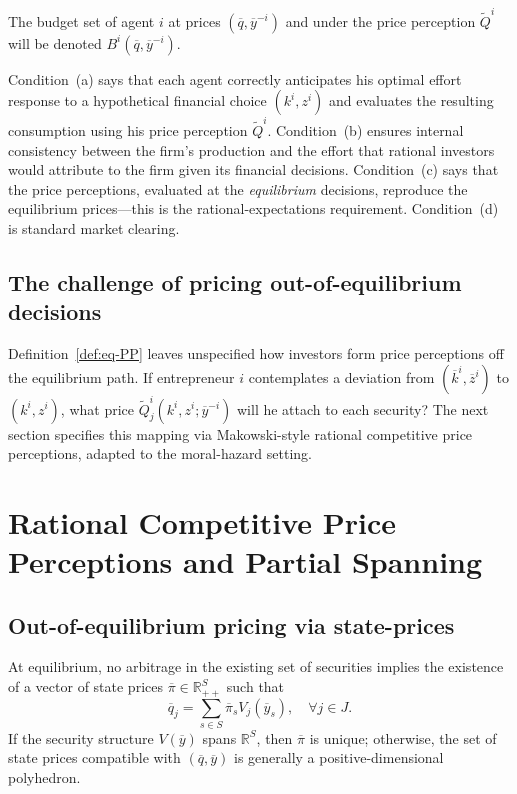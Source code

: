 \documentclass[11pt,a4paper,oneside]{book}
\def\R{\mathbb{R}}
\theoremstyle{plain}
\theoremstyle{definition}
\theoremstyle{remark}
\numberwithin{equation}{chapter}
\begin{document}
The budget set of agent $i$ at prices $(\overline{q}, \overline{y}^{-i})$ and under the price perception $\widetilde{Q}^i$ will be denoted $B^i(\overline{q}, \overline{y}^{-i})$.

Condition~(a) says that each agent correctly anticipates his optimal effort response to a hypothetical financial choice $(k^i, z^i)$ and evaluates the resulting consumption using his price perception $\widetilde{Q}^i$.
Condition~(b) ensures internal consistency between the firm's production and the effort that rational investors would attribute to the firm given its financial decisions.
Condition~(c) says that the price perceptions, evaluated at the \emph{equilibrium} decisions, reproduce the equilibrium prices---this is the rational-expectations requirement.
Condition~(d) is standard market clearing.

\subsection{The challenge of pricing out-of-equilibrium decisions}

Definition~\ref{def:eq-PP} leaves unspecified how investors form price perceptions off the equilibrium path.
If entrepreneur $i$ contemplates a deviation from $(\overline{k}^i, \overline{z}^i)$ to $(k^i, z^i)$, what price $\widetilde{Q}^i_j(k^i, z^i; \overline{y}^{-i})$ will he attach to each security?
The next section specifies this mapping via Makowski-style rational competitive price perceptions, adapted to the moral-hazard setting.

\section{Rational Competitive Price Perceptions and Partial Spanning}
\label{sec:RCPP}

\subsection{Out-of-equilibrium pricing via state-prices}

At equilibrium, no arbitrage in the existing set of securities implies the existence of a vector of state prices $\overline{\pi} \in \R_{++}^S$ such that
\begin{equation}\label{eq:state-prices}
  \overline{q}_j = \sum_{s \in S} \overline{\pi}_s V_j(\overline{y}_s),
  \quad \forall j \in J.
\end{equation}
If the security structure $V(\overline{y})$ spans $\R^S$, then $\overline{\pi}$ is unique; otherwise, the set of state prices compatible with $(\overline{q}, \overline{y})$ is generally a positive-dimensional polyhedron.
\end{document}
